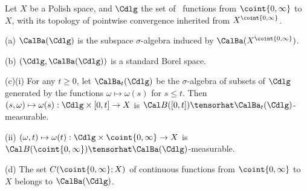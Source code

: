 Let $X$ be a Polish space, and $\Cdlg$ the set of \cadlag\
functions from $\coint{0,\infty}$ to $X$,
with its topology of
pointwise convergence inherited from $X^{\coint{0,\infty}}$.

(a) $\CalBa(\Cdlg)$ is the subspace $\sigma$-algebra induced by
$\CalBa(X^{\coint{0,\infty}})$.

(b) $(\Cdlg,\CalBa(\Cdlg))$ is a standard Borel space.

(c)(i) For any $t\ge 0$, let $\CalBa_t(\Cdlg)$ be the $\sigma$-algebra
of subsets of $\Cdlg$ generated by the functions $\omega\mapsto\omega(s)$
for $s\le t$.   Then
$(s,\omega)\mapsto\omega(s):\Cdlg\times[0,t]\to X$ is
$\Cal B([0,t])\tensorhat\CalBa_t(\Cdlg)$-measurable.

\quad(ii) $(\omega,t)\mapsto\omega(t):\Cdlg\times\coint{0,\infty}\to X$ is
$\Cal B(\coint{0,\infty})\tensorhat\CalBa(\Cdlg)$-measurable.

(d) The set $C(\coint{0,\infty};X)$ of continuous functions from
$\coint{0,\infty}$ to $X$ belongs to $\CalBa(\Cdlg)$.

